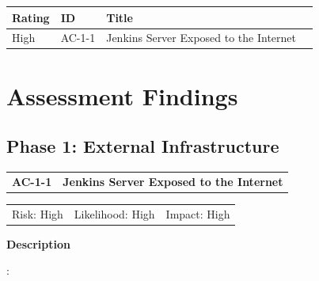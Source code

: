 \documentclass[11pt]{article}
\begin{document}
\begin{table}[ht]
\centering %
\begin{tabularx}{\textwidth}{|l|l|l|X|}
\hline
\textbf{Rating} & \textbf{ID} & \textbf{Title} \\ \hline
High & AC-1-1 & Jenkins Server Exposed to the Internet \\ \hline
\end{tabularx}
\end{table}

\pagebreak

\section{Assessment Findings}

\subsection{Phase 1: External Infrastructure}


\begin{table}[h!]
    \noindent
    \begin{tabularx}{\linewidth}{lX}
        \textbf{AC-1-1} & \textbf{ Jenkins Server Exposed to the Internet}
    \end{tabularx}
    \begin{tabularx}{\linewidth}{XXX}
        Risk: High  & Likelihood: High & Impact: High \\
    \end{tabularx}
\end{table}

\textbf{Description}

\lipsum[1][1-5]
\vspace{6pt}
\lipsum[2][6]:
\end{document}
